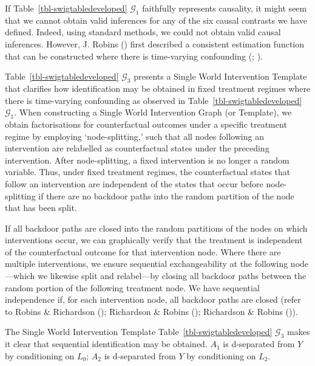 \documentclass[
  single column]{article}
\begin{document}
If Table~\ref{tbl-swigtabledeveloped} \(\mathcal{G}_1\) faithfully
represents causality, it might seem that we cannot obtain valid
inferences for any of the six causal contrasts we have defined. Indeed,
using standard methods, we could not obtain valid causal inferences.
However, J. Robins () first described a
consistent estimation function that can be constructed where there is
time-varying confounding (; ).

Table~\ref{tbl-swigtabledeveloped} \(\mathcal{G}_3\) presents a Single
World Intervention Template that clarifies how identification may be
obtained in fixed treatment regimes where there is time-varying
confounding as observed in Table~\ref{tbl-swigtabledeveloped}
\(\mathcal{G}_1\). When constructing a Single World Intervention Graph
(or Template), we obtain factorisations for counterfactual outcomes
under a specific treatment regime by employing `node-splitting,' such
that all nodes following an intervention are relabelled as
counterfactual states under the preceding intervention. After
node-splitting, a fixed intervention is no longer a random variable.
Thus, under fixed treatment regimes, the counterfactual states that
follow an intervention are independent of the states that occur before
node-splitting if there are no backdoor paths into the random partition
of the node that has been split.

If all backdoor paths are closed into the random partitions of the nodes
on which interventions occur, we can graphically verify that the
treatment is independent of the counterfactual outcome for that
intervention node. Where there are multiple interventions, we ensure
sequential exchangeability at the following node---which we likewise
split and relabel---by closing all backdoor paths between the random
portion of the following treatment node. We have sequential independence
if, for each intervention node, all backdoor paths are closed (refer to
Robins \& Richardson ();
Richardson \& Robins ();
Richardson \& Robins ()).

The Single World Intervention Template
Table~\ref{tbl-swigtabledeveloped} \(\mathcal{G}_3\) makes it clear that
sequential identification may be obtained. \(A_1\) is d-separated from
\(Y\) by conditioning on \(L_0\); \(A_2\) is d-separated from \(Y\) by
conditioning on \(L_2\).
\end{document}
